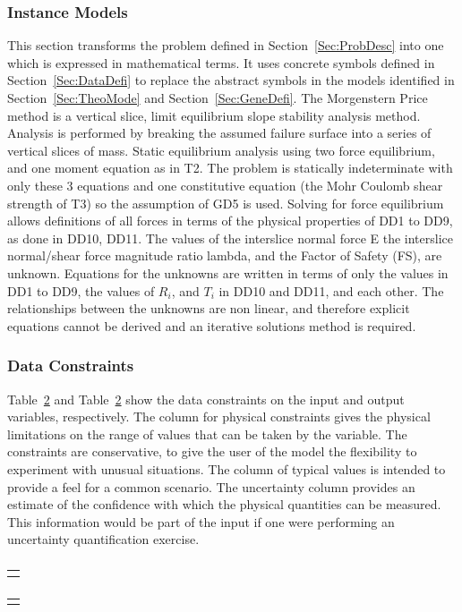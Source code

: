 \documentclass[12pt]{article}
\begin{document}
\subsubsection{Instance Models}
\label{Sec:InstMode}
This section transforms the problem defined in Section~\ref{Sec:ProbDesc} into one which is expressed in mathematical terms. It uses concrete symbols defined in Section~\ref{Sec:DataDefi} to replace the abstract symbols in the models identified in Section~\ref{Sec:TheoMode} and Section~\ref{Sec:GeneDefi}.
The Morgenstern Price method is a vertical slice, limit equilibrium slope stability analysis method. Analysis is performed by breaking the assumed failure surface into a series of vertical slices of mass. Static equilibrium analysis using two force equilibrium, and one moment equation as in T2. The problem is statically indeterminate with only these 3 equations and one constitutive equation (the Mohr Coulomb shear strength of T3) so the assumption of GD5 is used. Solving for force equilibrium allows definitions of all forces in terms of the physical properties of DD1 to DD9, as done in DD10, DD11.
The values of the interslice normal force E the interslice normal/shear force magnitude ratio lambda, and the Factor of Safety (FS), are unknown. Equations for the unknowns are written in terms of only the values in DD1 to DD9, the values of $R_{i}$, and $T_{i}$ in DD10 and DD11, and each other. The relationships between the unknowns are non linear, and therefore explicit equations cannot be derived and an iterative solutions method is required.
\subsubsection{Data Constraints}
\label{Sec:DataCons}
Table~\ref{Table:} and Table~\ref{Table:} show the data constraints on the input and output variables, respectively. The column for physical constraints gives the physical limitations on the range of values that can be taken by the variable. The constraints are conservative, to give the user of the model the flexibility to experiment with unusual situations. The column of typical values is intended to provide a feel for a common scenario. The uncertainty column provides an estimate of the confidence with which the physical quantities can be measured. This information would be part of the input if one were performing an uncertainty quantification exercise.
\begin{longtable}{l}
\toprule
\\
\midrule
\bottomrule
\caption{}
\label{Table:}
\end{longtable}
\begin{longtable}{l}
\toprule
\\
\midrule
\bottomrule
\caption{}
\label{Table:}
\end{longtable}
\end{document}
